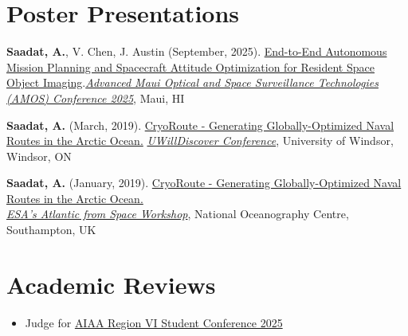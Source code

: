 \documentclass[letterpaper,11pt]{article}
\newcommand{\shiftleft}[2]{\makebox[0pt][r]{\makebox[#1][l]{#2}}}
\newcommand{\cvIcon}[1]{\BeginAccSupp{ActualText={}}#1\EndAccSupp{}}
\def\shiftleft#1#2{}%
\def\faDesktop{}%
\def\faBookReader{}%
\begin{document}
\section[Poster Presentations]{\shiftleft{19pt}{\cvIcon{\faDesktop}}Poster Presentations}
 \begin{itemize}[leftmargin=0.15in, label={}]
    \small{
    \item{\textbf{Saadat, A.}, V. Chen, J. Austin (September, 2025). \href{https://www.researchgate.net/publication/395773552_End-to-End_Autonomous_Mission_Planning_and_Spacecraft_Attitude_Optimization_for_Resident_Space_Object_Imaging_Motivation_and_Objectives}{End-to-End Autonomous Mission Planning and Spacecraft Attitude Optimization for Resident Space Object Imaging}.\newline\href{https://amostech.com/}{\emph{Advanced Maui Optical and Space Surveillance Technologies (AMOS) Conference 2025}}, Maui, HI}

    \item{\textbf{Saadat, A.} (March, 2019). \href{https://www.atillasaadat.com/post/cryoroute-globally-optimized-naval-routes-in-north-arctic-ocean}{CryoRoute - Generating Globally-Optimized Naval Routes in the Arctic Ocean.} \href{https://scholar.uwindsor.ca/UWillDiscover/}{\emph{UWillDiscover Conference}}, University of Windsor, Windsor, ON}
    
    \item{\textbf{Saadat, A.} (January, 2019). \href{https://www.atillasaadat.com/post/cryoroute-globally-optimized-naval-routes-in-north-arctic-ocean}{CryoRoute - Generating Globally-Optimized Naval Routes in the Arctic Ocean.} \\ \href{https://eo4society.esa.int/resources/atlantic-from-space-2019/}{\emph{ESA's Atlantic from Space Workshop}}, National Oceanography Centre, Southampton, UK}
    }
 \end{itemize}
\vspace{-15pt}


\section[Academic Reviews]{\shiftleft{20pt}{\cvIcon{\faBookReader}}Academic Reviews}
 \begin{itemize}[leftmargin=0.15in, label={}]
    \item{Judge for \href{https://aiaa.org/events/2025-region-vi-student-conference/}{AIAA Region VI Student Conference 2025}}
 \end{itemize}
\vspace{-15pt}
\end{document}

